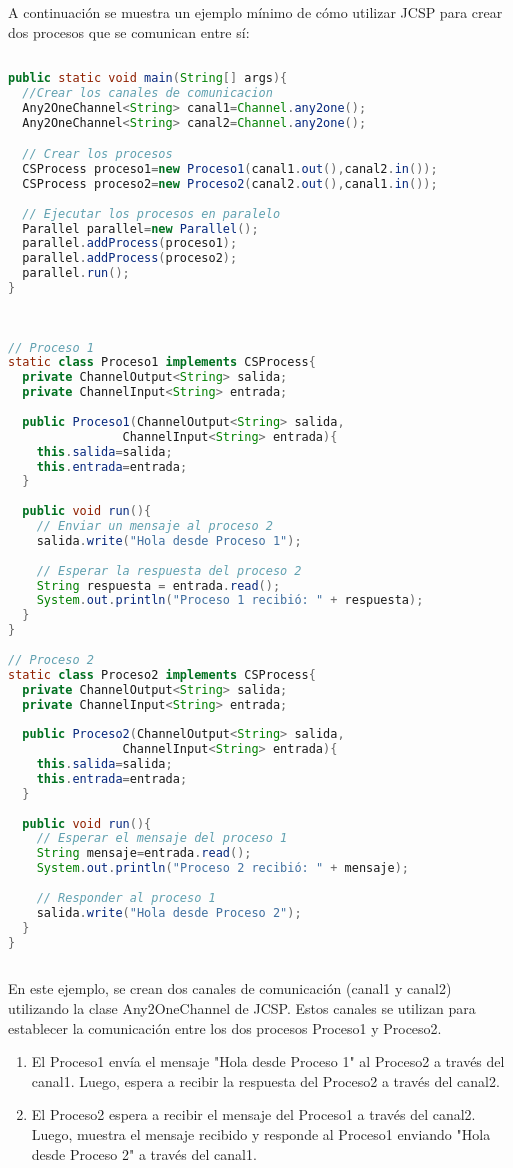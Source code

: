\noindent A continuación se muestra un ejemplo mínimo de cómo utilizar JCSP para crear dos procesos que se comunican entre sí:
\begin{lstlisting}[language=Java, frame=single, caption={Ejemplo JCSP}]
	
public static void main(String[] args){
  //Crear los canales de comunicacion
  Any2OneChannel<String> canal1=Channel.any2one();
  Any2OneChannel<String> canal2=Channel.any2one();

  // Crear los procesos
  CSProcess proceso1=new Proceso1(canal1.out(),canal2.in());
  CSProcess proceso2=new Proceso2(canal2.out(),canal1.in());
		
  // Ejecutar los procesos en paralelo
  Parallel parallel=new Parallel();
  parallel.addProcess(proceso1);
  parallel.addProcess(proceso2);
  parallel.run();
}
	
	
	
// Proceso 1
static class Proceso1 implements CSProcess{
  private ChannelOutput<String> salida;
  private ChannelInput<String> entrada;
		
  public Proceso1(ChannelOutput<String> salida, 
  				ChannelInput<String> entrada){
    this.salida=salida;
	this.entrada=entrada;
  }
		
  public void run(){
    // Enviar un mensaje al proceso 2
    salida.write("Hola desde Proceso 1");
			
    // Esperar la respuesta del proceso 2
    String respuesta = entrada.read();
    System.out.println("Proceso 1 recibió: " + respuesta);
  }
}
	
// Proceso 2
static class Proceso2 implements CSProcess{
  private ChannelOutput<String> salida;
  private ChannelInput<String> entrada;
		
  public Proceso2(ChannelOutput<String> salida,
  				ChannelInput<String> entrada){
    this.salida=salida;
    this.entrada=entrada;
  }
		
  public void run(){
    // Esperar el mensaje del proceso 1
    String mensaje=entrada.read();
    System.out.println("Proceso 2 recibió: " + mensaje);
		
    // Responder al proceso 1
    salida.write("Hola desde Proceso 2");
  }
}
	
\end{lstlisting}
En este ejemplo, se crean dos canales de comunicación (canal1 y canal2) utilizando la clase Any2OneChannel de JCSP. Estos canales se utilizan para establecer la comunicación entre los dos procesos Proceso1 y Proceso2.
\begin{enumerate}
	\item El Proceso1 envía el mensaje "Hola desde Proceso 1" al Proceso2 a través del canal1. Luego, espera a recibir la respuesta del Proceso2 a través del canal2.
	
	\item El Proceso2 espera a recibir el mensaje del Proceso1 a través del canal2. Luego, muestra el mensaje recibido y responde al Proceso1 enviando "Hola desde Proceso 2" a través del canal1.
\end{enumerate}

